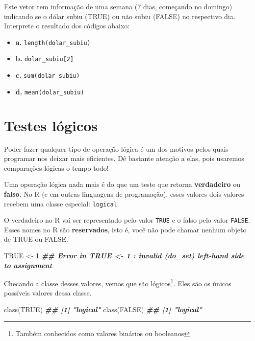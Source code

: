 \documentclass[
]{book}
\newenvironment{Shaded}{\begin{snugshade}}{\end{snugshade}}
\newcommand{\ConstantTok}[1]{\textcolor[rgb]{0.00,0.00,0.00}{#1}}
\newcommand{\DecValTok}[1]{\textcolor[rgb]{0.00,0.00,0.81}{#1}}
\newcommand{\DocumentationTok}[1]{\textcolor[rgb]{0.56,0.35,0.01}{\textbf{\textit{#1}}}}
\newcommand{\FunctionTok}[1]{\textcolor[rgb]{0.00,0.00,0.00}{#1}}
\newcommand{\NormalTok}[1]{#1}
\newcommand{\OtherTok}[1]{\textcolor[rgb]{0.56,0.35,0.01}{#1}}
\begin{document}
Este vetor tem informação de uma semana (7 dias, começando no domingo) indicando se o dólar subiu (TRUE) ou não subiu (FALSE) no respectivo dia. Interprete o resultado dos códigos abaixo:

\begin{itemize}
\item
  \textbf{a.} \texttt{length(dolar\_subiu)}
\item
  \textbf{b.} \texttt{dolar\_subiu{[}2{]}}
\item
  \textbf{c.} \texttt{sum(dolar\_subiu)}
\item
  \textbf{d.} \texttt{mean(dolar\_subiu)}
\end{itemize}

\hypertarget{testes-luxf3gicos}{%
\section{Testes lógicos}\label{testes-luxf3gicos}}

Poder fazer qualquer tipo de operação lógica é um dos motivos pelos quais programar nos deixar mais eficientes. Dê bastante atenção a elas, pois usaremos comparações lógicas o tempo todo!

Uma operação lógica nada mais é do que um teste que retorna \textbf{verdadeiro} ou \textbf{falso}. No R (e em outras linguagens de programação), esses valores dois valores recebem uma classe especial: \texttt{logical}.

O verdadeiro no R vai ser representado pelo valor \texttt{TRUE} e o falso pelo valor \texttt{FALSE}. Esses nomes no R são \textbf{reservados}, isto é, você não pode chamar nenhum objeto de TRUE ou FALSE.

\begin{Shaded}
\begin{Highlighting}[]
\ConstantTok{TRUE} \OtherTok{\textless{}{-}} \DecValTok{1}
\DocumentationTok{\#\# Error in TRUE \textless{}{-} 1 : invalid (do\_set) left{-}hand side to assignment}
\end{Highlighting}
\end{Shaded}

Checando a classe desses valores, vemos que são lógicos\footnote{Também conhecidos como valores binários ou booleanos}. Eles são os únicos possíveis valores dessa classe.

\begin{Shaded}
\begin{Highlighting}[]
\FunctionTok{class}\NormalTok{(}\ConstantTok{TRUE}\NormalTok{)}
\DocumentationTok{\#\# [1] "logical"}
\FunctionTok{class}\NormalTok{(}\ConstantTok{FALSE}\NormalTok{)}
\DocumentationTok{\#\# [1] "logical"}
\end{Highlighting}
\end{Shaded}
\end{document}
